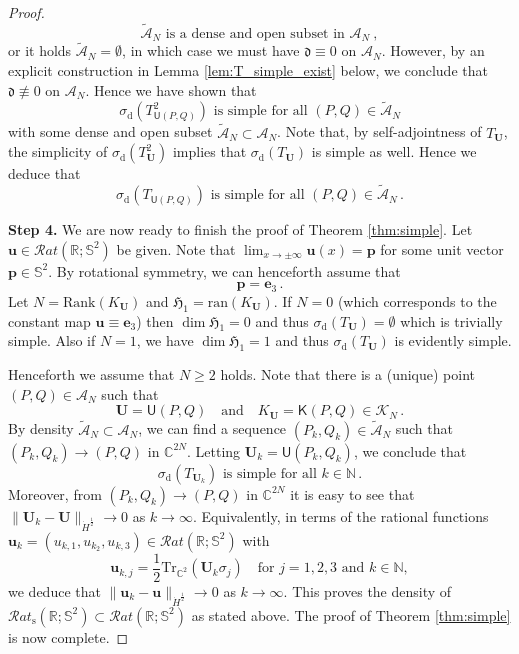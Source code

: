 \documentclass[11pt,reqno]{amsart}
\theoremstyle{definition}
\theoremstyle{remark}
\theoremstyle{remark}
\numberwithin{equation}{section}
\newcommand{\Hfr}{\mathfrak{H}}
\newcommand{\C}{\mathbb{C}}
\newcommand{\N}{\mathbb{N}}
\newcommand{\R}{\mathbb{R}}
\newcommand{\Ss}{\mathbb{S}}
\newcommand{\ran}{\mathrm{ran}}
\newcommand{\uu}{\mathbf{u}}
\newcommand{\Ub}{\mathbf{U}}
\newcommand{\Tr}{\mathrm{Tr}}
\begin{document}
\begin{proof}
$$
\mbox{$\widetilde{\mathcal{A}}_N$ is a dense and open subset in $\mathcal{A}_N$} \ ,
$$
or it holds $\widetilde{\mathcal{A}}_N = \emptyset$, in which case we must have $\mathfrak{d} \equiv 0$ on $\mathcal{A}_N$. However, by an explicit construction in Lemma \ref{lem:T_simple_exist} below, we conclude that $\mathfrak{d} \not \equiv 0$ on $\mathcal{A}_N$. Hence we have shown that 
$$
\mbox{$\sigma_{\mathrm{d}}(T_{\mathsf{U}(P,Q)}^2)$ is simple for all $(P,Q) \in \widetilde{\mathcal{A}}_N$} 
$$
with some dense and open subset $\widetilde{\mathcal{A}}_N \subset \mathcal{A}_N$. Note that, by self-adjointness of $T_{\Ub}$, the simplicity of $\sigma_{\mathrm{d}}(T_{\Ub}^2)$ implies that $\sigma_{\mathrm{d}}(T_{\Ub})$ is simple as well. Hence we deduce that
$$
\mbox{$\sigma_{\mathrm{d}}(T_{\mathsf{U}(P,Q)})$ is simple for all $(P,Q) \in \widetilde{\mathcal{A}}_N$} \, .
$$

\medskip
\textbf{Step 4.} We are now ready to finish the proof of Theorem \ref{thm:simple}. Let $\uu \in \mathcal{R}at(\R; \Ss^2)$ be given. Note that $\lim_{x \to \pm \infty}\uu(x) = \mathbf{p}$ for some unit vector $\mathbf{p} \in \Ss^2$. By rotational symmetry, we can henceforth assume that
$$
\mathbf{p} = \mathbf{e}_3 \, .
$$
Let $N = \mathrm{Rank}(K_\Ub)$ and $\Hfr_1 = \ran(K_\Ub)$. If $N=0$ (which corresponds to the constant map $\uu \equiv \mathbf{e}_3$) then $\dim \Hfr_1 = 0$ and thus $\sigma_{\mathrm{d}}(T_{\Ub}) = \emptyset$ which is trivially simple. Also if $N=1$, we have $\dim \Hfr_1 = 1$ and thus $\sigma_{\mathrm{d}}(T_{\Ub})$ is evidently simple.

Henceforth we assume that $N \geq 2$ holds. Note that there is a (unique) point $(P,Q) \in \mathcal{A}_N$ such that
$$
\Ub = \mathsf{U}(P,Q) \quad \mbox{and} \quad K_\Ub = \mathsf{K}(P,Q) \in \mathcal{K}_N \, .
$$
By density $\widetilde{\mathcal{A}}_N \subset \mathcal{A}_N$, we can find a sequence $(P_k, Q_k) \in \widetilde{\mathcal{A}}_N$ such that $(P_k, Q_k) \to (P,Q)$ in $\C^{2N}$. Letting $\Ub_k = \mathsf{U}(P_k,Q_k)$, we conclude that
$$
\mbox{$\sigma_{\mathrm{d}}(T_{\Ub_k})$ is simple for all $k \in \N$} \, .
$$ 
Moreover, from $(P_k,Q_k) \to (P,Q)$ in $\C^{2N}$ it is easy to see that $\| \Ub_k - \Ub \|_{\dot{H}^{\frac 1 2}} \to 0$ as $k \to \infty$. Equivalently, in terms of the rational functions $\uu_k =( u_{k,1}, u_{k_2}, u_{k,3}) \in \mathcal{R}at(\R; \Ss^2)$ with
$$
\uu_{k,j} =  \frac{1}{2} \Tr_{\C^2} (\Ub_k \sigma_j) \quad \mbox{for $j=1,2,3$ and $k \in \N$},
$$
we deduce that $\| \uu_k - \uu \|_{\dot{H}^{\frac 1 2}} \to 0$ as $k \to \infty$. This proves  the density of  $\mathcal{R}at_{\mathrm{s}}(\R; \Ss^2) \subset \mathcal{R}at(\R; \Ss^2)$ as stated above. The proof of Theorem \ref{thm:simple} is now complete.
\end{proof}
\end{document}
